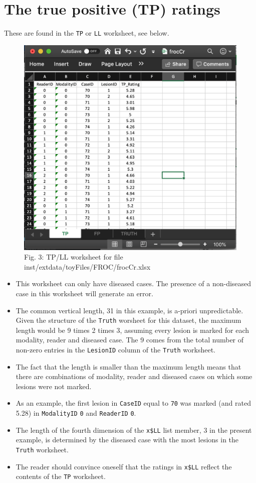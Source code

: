 \documentclass[]{book}
\providecommand{\tightlist}{%
  \setlength{\itemsep}{0pt}\setlength{\parskip}{0pt}}
\begin{document}
\hypertarget{the-true-positive-tp-ratings-1}{%
\section{The true positive (TP) ratings}\label{the-true-positive-tp-ratings-1}}

These are found in the \texttt{TP} or \texttt{LL} worksheet, see below.

\begin{figure}

{\centering \includegraphics[width=0.5\linewidth,height=0.2\textheight]{images/frocCrLL} 

}

\caption{Fig. 3: TP/LL worksheet for file inst/extdata/toyFiles/FROC/frocCr.xlsx}\label{fig:frocCrLL}
\end{figure}

\begin{itemize}
\tightlist
\item
  This worksheet can only have diseased cases. The presence of a non-diseased case in this worksheet will generate an error.
\item
  The common vertical length, 31 in this example, is a-priori unpredictable. Given the structure of the \texttt{Truth} worsheet for this dataset, the maximum length would be 9 times 2 times 3, assuming every lesion is marked for each modality, reader and diseased case. The 9 comes from the total number of non-zero entries in the \texttt{LesionID} column of the \texttt{Truth} worksheet.
\item
  The fact that the length is smaller than the maximum length means that there are combinations of modality, reader and diseased cases on which some lesions were not marked.
\item
  As an example, the first lesion in \texttt{CaseID} equal to \texttt{70} was marked (and rated 5.28) in \texttt{ModalityID} \texttt{0} and \texttt{ReaderID} \texttt{0}.
\item
  The length of the fourth dimension of the \texttt{x\$LL} list member, 3 in the present example, is determined by the diseased case with the most lesions in the \texttt{Truth} worksheet.
\item
  The reader should convince oneself that the ratings in \texttt{x\$LL} reflect the contents of the \texttt{TP} worksheet.
\end{itemize}
\end{document}
